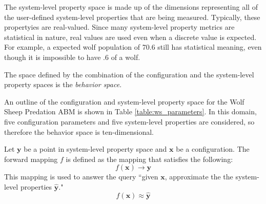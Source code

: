 The system-level property space is made up of the dimensions representing all of the user-defined system-level properties that are being measured.
Typically, these propertyies are real-valued.
Since many system-level property metrics are statistical in nature, real values are used even when a discrete value is expected.
For example, a expected wolf population of 70.6 still has statistical meaning, even though it is impossible to have .6 of a wolf.

The space defined by the combination of the configuration and the system-level property spaces is the \textit{behavior space}.

An outline of the configuration and system-level property space for the Wolf Sheep Predation ABM is shown in Table \ref{table:ws_parameters}.
In this domain, five configuration parameters and five system-level properties are considered, so therefore the behavior space is ten-dimensional.


Let $\mathbf{y}$ be a point in system-level property space and $\mathbf x$ be a configuration.
The forward mapping $f$ is defined as the mapping that satisfies the following:
\[ f(\mathbf x) \rightarrow \mathbf{y} \]
This mapping is used to answer the query ``given $\mathbf x$, approximate the the system-level properties  $\hat{\mathbf y}$."
\[ f(\mathbf x) \approx \hat{\mathbf y} \]




